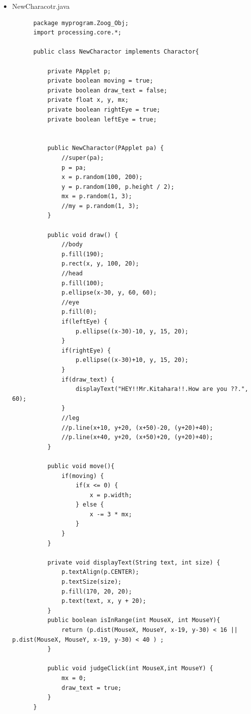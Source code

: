 \documentclass[dvipdfmx]{jsarticle}
\begin{document}
\begin{enumerate}
\begin{itemize}
\begin{verbatim}
      interface Charactor {
          void draw();
          void move();
          void judgeClick(int MouseX, int MouseY);
          boolean isInRange(int MouseX, int MouseY);
      }
    \end{verbatim}
    \item NewCharacotr.java
    \begin{verbatim}
      package myprogram.Zoog_Obj;
      import processing.core.*;

      public class NewCharactor implements Charactor{

          private PApplet p;
          private boolean moving = true;
          private boolean draw_text = false;
          private float x, y, mx;
          private boolean rightEye = true;
          private boolean leftEye = true;


          public NewCharactor(PApplet pa) {
              //super(pa);
              p = pa;
              x = p.random(100, 200);
              y = p.random(100, p.height / 2);
              mx = p.random(1, 3);
              //my = p.random(1, 3);
          }

          public void draw() {
              //body
              p.fill(190);
              p.rect(x, y, 100, 20);
              //head
              p.fill(100);
              p.ellipse(x-30, y, 60, 60);
              //eye
              p.fill(0);
              if(leftEye) {
                  p.ellipse((x-30)-10, y, 15, 20);
              }
              if(rightEye) {
                  p.ellipse((x-30)+10, y, 15, 20);
              }
              if(draw_text) {
                  displayText("HEY!!Mr.Kitahara!!.How are you ??.", 60);
              }
              //leg
              //p.line(x+10, y+20, (x+50)-20, (y+20)+40);
              //p.line(x+40, y+20, (x+50)+20, (y+20)+40);
          }

          public void move(){
              if(moving) {
                  if(x <= 0) {
                      x = p.width;
                  } else {
                      x -= 3 * mx;
                  }
              }
          }

          private void displayText(String text, int size) {
              p.textAlign(p.CENTER);
              p.textSize(size);
              p.fill(170, 20, 20);
              p.text(text, x, y + 20);
          }
          public boolean isInRange(int MouseX, int MouseY){
              return (p.dist(MouseX, MouseY, x-19, y-30) < 16 || p.dist(MouseX, MouseY, x-19, y-30) < 40 ) ;
          }

          public void judgeClick(int MouseX,int MouseY) {
              mx = 0;
              draw_text = true;
          }
      }
    \end{verbatim}
  \end{itemize}
\end{enumerate}
\end{document}
